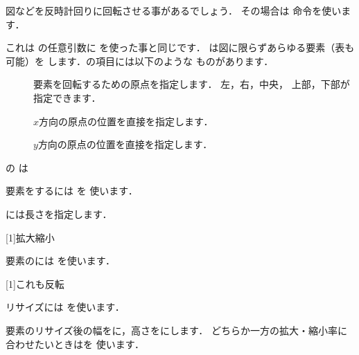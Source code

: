 図などを反時計回りに回転させる事があるでしょう．
その場合は 命令を使います．
\begin{Syntax}
\end{Syntax}
これは の任意引数に
を使った事と同じです．
 は図に限らずあらゆる要素（表も可能）を
します．の項目には以下のような
ものがあります．
\begin{description}
\item[] 
 要素を回転するための原点を指定します．%
 左，右，中央，
 上部，下部が指定できます．
\item[] 
$x$方向の原点の位置を直接を指定します．
\item[]
$y$方向の原点の位置を直接を指定します．
\end{description}

\begin{InOut}
の
は
\end{InOut}
%
要素をするには を
使います．
\begin{Syntax}
\end{Syntax}
には長さを指定します．\begin{InOut}
\par
\scalebox{3}[1]{拡大縮小}
\end{InOut}

要素のには を使います．
\begin{Syntax}
\end{Syntax}
\begin{InOut}
\par
{}\par
\scalebox{-1}[1]{これも反転}
\end{InOut}

リサイズには を使います．
\begin{Syntax}
\end{Syntax}
要素のリサイズ後の幅をに，高さをにします．
どちらか一方の拡大・縮小率に合わせたいときは\qu{\str!}を
使います．
\begin{InOut}
\par
{}
\end{InOut}


